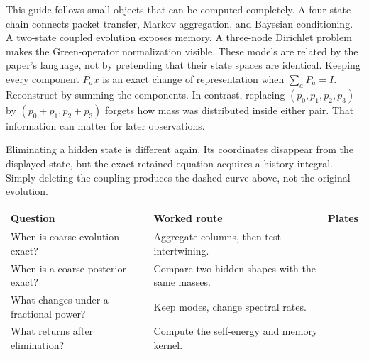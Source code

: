 This guide follows small objects that can be computed completely. A four-state chain connects packet transfer, Markov aggregation, and Bayesian conditioning. A two-state coupled evolution exposes memory. A three-node Dirichlet problem makes the Green-operator normalization visible. These models are related by the paper's language, not by pretending that their state spaces are identical.
Keeping every component $P_a x$ is an exact change of representation when $\sum_aP_a=I$. Reconstruct by summing the components. In contrast, replacing $(p_0,p_1,p_2,p_3)$ by $(p_0+p_1,p_2+p_3)$ forgets how mass was distributed inside either pair. That information can matter for later observations.

Eliminating a hidden state is different again. Its coordinates disappear from the displayed state, but the exact retained equation acquires a history integral. Simply deleting the coupling produces the dashed curve above, not the original evolution.
\begin{center}\small
\begin{tabularx}{\linewidth}{@{}lYl@{}}\toprule
Question & Worked route & Plates\\\midrule
When is coarse evolution exact? & Aggregate columns, then test intertwining. & \\
When is a coarse posterior exact? & Compare two hidden shapes with the same masses. & \\
What changes under a fractional power? & Keep modes, change spectral rates. & \\
What returns after elimination? & Compute the self-energy and memory kernel. & \\\bottomrule
\end{tabularx}\end{center}

